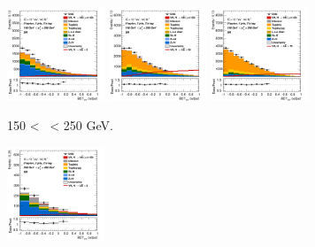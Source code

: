 \vspace*{\fill}
\begin{figure}[h!]
    \centering
    \begin{subfigure}[b]{\textwidth}
        \centering
        \includegraphics[width=0.32\textwidth]{Images/VH/Own_fit/prefit_VHbb/Region_distmva_BMax250_BMin150_DSR_J2_TTypebb_T2_L0_Y6051_Prefit.png}
        \includegraphics[width=0.32\textwidth]{Images/VH/Own_fit/prefit_VHbb/Region_distmva_BMax250_BMin150_DSR_J3_TTypebb_T2_L0_Y6051_Prefit.png}
        \includegraphics[width=0.32\textwidth]{Images/VH/Own_fit/prefit_VHbb/Region_distmva_BMax250_BMin150_DSR_J4_TTypebb_T2_L0_Y6051_Prefit.png}
        \caption{150 < \ptv\ < 250 GeV.}
        \label{fig:plots_VHbb_OL_150_SR}
    \end{subfigure}
    \begin{subfigure}[b]{\textwidth}
        \centering
        \includegraphics[width=0.32\textwidth]{Images/VH/Own_fit/prefit_VHbb/Region_distmva_BMax400_BMin250_DSR_J2_TTypebb_T2_L0_Y6051_Prefit.png}

\end{subfigure}
\end{figure}
